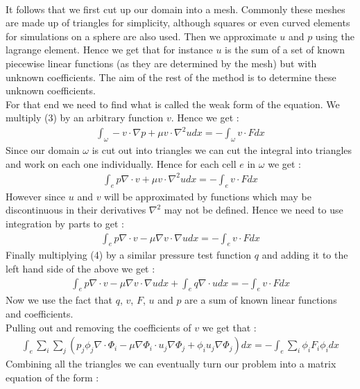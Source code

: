 \documentclass[11pt,twoside,a4paper]{article}
\begin{document}
\\
It follows that we first cut up our domain into a mesh. Commonly these meshes are made up of triangles for simplicity, although squares or even curved elements for simulations on a sphere are also used. Then we approximate $u$ and $p$ using the lagrange element. Hence we get that for instance $u$ is the sum of a set of known piecewise linear functions (as they are determined by the mesh) but with unknown coefficients. The aim of the rest of the method is to determine these unknown coefficients.\\
For that end we need to find what is called the weak form of the equation. We multiply (3) by an arbitrary function $v$. Hence we get :
\begin{align*}
\int_{\omega} -v \cdot \nabla p + \mu v \cdot \nabla^2 u dx = -\int_{\omega} v \cdot F dx
\end{align*}
Since our domain $\omega$ is cut out into triangles we can cut the integral into triangles and work on each one individually. Hence for each cell $e$ in $\omega$ we get : 
\begin{align*}
\int_{e} p \nabla \cdot v + \mu v \cdot \nabla^2 u dx =  -\int_{e} v \cdot F dx
\end{align*}
However since $u$ and $v$ will be approximated by functions which may be discontinuous in their derivatives $\nabla^2$ may not be defined. Hence we need to use integration by parts to get :  
\begin{align*}
\int_{e} p \nabla \cdot v - \mu \nabla v \cdot \nabla u dx = -\int_{e} v \cdot F dx
\end{align*}
Finally multiplying (4) by a similar pressure test function $q$ and adding it to the left hand side of the above we get :
\begin{align}
\int_{e} p \nabla \cdot v - \mu \nabla v \cdot \nabla u dx + \int_{e} q \nabla \cdot u dx = -\int_{e} v \cdot F dx
\end{align}
Now we use the fact that $q$, $v$, $F$, $u$ and $p$ are a sum of known linear functions and coefficients.\\
Pulling out and removing the coefficients of $v$ we get that :
\begin{align*}
 \int_{e} \sum_i \sum_j (  p_j \phi_j \nabla  \cdot \Phi_i - \mu \nabla \Phi_i \cdot u_j \nabla \Phi_j +   \phi_i u_j \nabla \Phi_j) dx = -\int_{e} \sum_i \phi_i F_i \phi_i dx
\end{align*}
Combining all the triangles we can eventually turn our problem into a matrix equation of the form :
\end{document}
